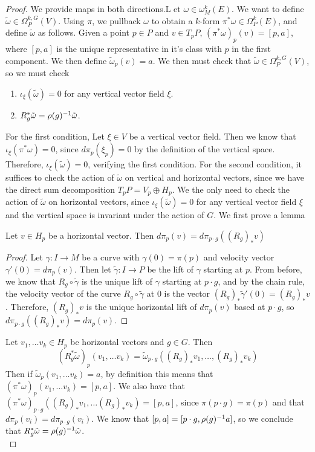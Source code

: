 \begin{proof}%
We provide maps in both directions.L et $\omega \in \omega_M^k(E)$. We want to define
$\widetilde{\omega} \in \Omega_P^{k,G}(V)$. Using $\pi$, we pullback
$\omega$ to obtain a $k$-form $\pi^*\omega \in \Omega_P^k(E)$, and define
$\tilde{\omega}$ as follows. Given a point $p \in P$ and $v \in T_pP$,
$(\pi^*\omega)_p(v) = [p, a]$, where $[p,a]$ is the unique representative in
it's class with $p$ in the first component. We then define
$\tilde{\omega}_p(v) = a$. We then must check that
$\tilde{\omega} \in \Omega^{k,G}_P(V)$, so we must check
\begin{enumerate}
  \item $\iota_{\xi}(\tilde{\omega}) = 0$ for any vertical vector field $\xi$.
  \item $R_g^*\tilde{\omega} = \rho(g)^{-1}\tilde{\omega}$.
\end{enumerate}
For the first condition, Let $\xi \in V$ be a vertical vector field. Then we know that
$\iota_{\xi}(\pi^*\omega)= 0$, since $d\pi_p(\xi_p) = 0$ by the definition of the
vertical space. Therefore, $\iota_{\xi}(\tilde{\omega}) = 0$, verifying the
first condition. For the second condition, it suffices to check the action of
$\tilde{\omega}$ on vertical and horizontal vectors, since we have the direct
sum decomposition $T_pP = V_p \oplus H_p$. We the only need to check the action
of $\tilde{\omega}$ on horizontal vectors, since $\iota_\xi({\tilde{\omega}}) = 0$
for any vertical vector field $\xi$ and the vertical space is invariant under the
action of $G$. We first prove a lemma
%
\begin{lem*}
Let $v \in H_p$ be a horizontal vector. Then
$d\pi_p(v) = d\pi_{p \cdot g}((R_g)_*v)$
\end{lem*}
%
\begin{proof}
Let $\gamma : I \to M$ be a curve with $\gamma(0) = \pi(p)$ and velocity vector
$\gamma'(0) = d\pi_p(v)$. Then let $\tilde{\gamma} : I \to P$ be the lift of
$\gamma$ starting at $p$. From before, we know that $R_g \circ \tilde{\gamma}$
is the unique lift of $\gamma$ starting at $p \cdot g$, and by the chain rule,
the velocity vector of the curve $R_g \circ \tilde{\gamma}$ at $0$ is the vector
$(R_g)_*\tilde{\gamma}'(0) = (R_g)_*v$. Therefore, $(R_g)_*v$ is the unique
horizontal lift of $d\pi_p(v)$ based at $p \cdot g$, so
$d\pi_{p \cdot g}((R_g)_*v) = d\pi_p(v)$.
\end{proof}
%
Let $v_1, \ldots v_k \in H_p$ be horizontal vectors and $g \in G$. Then
\[
(R_g^*\tilde{\omega})_p(v_1,\ldots v_k) =
\tilde{\omega}_{p \cdot g}((R_g)_*v_1, \ldots , (R_g)_* v_k)
\]
Then if $\tilde{\omega}_p(v_1, \ldots v_k) = a$, by definition this means that
$(\pi^*\omega)_p(v_1, \ldots v_k) = [p,a]$. We also have that
$(\pi^*\omega)_{p\cdot g}((R_g)_*v_1,\ldots (R_g)_*v_k) = [p,a]$, since
$\pi(p \cdot g) = \pi(p)$ and that $d\pi_p(v_i) = d\pi_{p \cdot g}(v_i)$.
We know that $[p,a] = [p \cdot g, \rho(g)^{-1} a]$, so we conclude that
$R_g^*\tilde{\omega} = \rho(g)^{-1}\tilde{\omega}$.\\


\end{proof}
